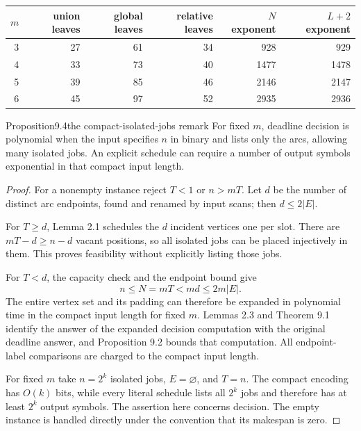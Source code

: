 \begin{center}\small
\begin{tabular}{@{}rrrrrr@{}}
\toprule
$m$ & union leaves & global leaves & relative leaves & $N$ exponent & $L+2$ exponent\\
\midrule
3&27&61&34&928&929\\
4&33&73&40&1477&1478\\
5&39&85&46&2146&2147\\
6&45&97&52&2935&2936\\
\bottomrule
\end{tabular}
\end{center}

\begin{numbered}{Proposition}{9.4}{the compact-isolated-jobs remark}
For fixed $m$, deadline decision is polynomial when the input specifies
$n$ in binary and lists only the arcs, allowing many isolated jobs.
An explicit schedule can require a number of output symbols
exponential in that compact input length.
\end{numbered}
\begin{proof}
For a nonempty instance reject $T<1$ or $n>mT$. Let $d$ be the number
of distinct arc endpoints, found and renamed by input scans; then
$d\leq2|E|$.

For $T\geq d$, Lemma 2.1 schedules the $d$ incident
vertices one per slot. There are $mT-d\geq n-d$ vacant positions, so
all isolated jobs can be placed injectively in them. This proves
feasibility without explicitly listing those jobs.

For $T<d$, the capacity check and the endpoint bound give
\[
 n\leq N=mT<md\leq2m|E|.
\]
The entire vertex set and its padding can therefore be expanded in
polynomial time in the compact input length for fixed $m$.
Lemmas 2.3 and Theorem 9.1 identify the answer of the expanded decision
computation with the original deadline answer, and Proposition 9.2
bounds that computation. All endpoint-label comparisons are charged
to the compact input length.

For fixed $m$ take $n=2^k$ isolated jobs, $E=\varnothing$, and $T=n$.
The compact encoding has $O(k)$ bits, while every literal schedule lists
all $2^k$ jobs and therefore has at least $2^k$ output symbols. The
assertion here concerns decision. The empty instance is handled directly
under the convention that its makespan is zero.
\end{proof}
